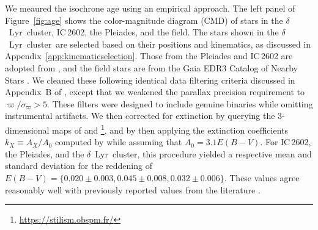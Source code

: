 \documentclass[12pt,modern,twocolumn,tighten]{aastex63}
\newcommand{\cn}{$\delta$\ Lyr\ cluster} %
\begin{document}
We meaured the isochrone age using an empirical approach.  The left
panel of Figure~\ref{fig:age} shows the color-magnitude diagram (CMD)
of stars in the \cn, IC\,2602, the Pleiades, and the field.  The stars
shown in the \cn\ are selected based on their positions and
kinematics, as discussed in Appendix~\ref{app:kinematicselection}.
Those from the Pleiades and IC\,2602 are adopted from
\citet{cantatgaudin_gaia_2018}, and the field stars are from the Gaia
EDR3 Catalog of Nearby Stars \citep{gaia_gcns_2021}.  We cleaned these
following identical data filtering criteria discussed in Appendix~B of
\citet{GaiaCollaboration2018}, except that we weakened the parallax
precision requirement to $\varpi/\sigma_\varpi>5$.  These filters were
designed to include genuine binaries while omitting instrumental
artifacts.  We then corrected for extinction by querying the
3-dimensional maps of \citet{capitanio_threedimensional_2017} and
\citet{lallement_threedimensional_2018}\footnote{\url{https://stilism.obspm.fr/}},
and by then applying the extinction coefficients $k_X\equiv A_X/A_0$
computed by \citet{GaiaCollaboration2018} while assuming that $A_0 =
3.1 E(B-V)$.  For IC\,2602, the Pleiades, and the \cn, this procedure
yielded a respective mean and standard deviation for the reddening of
$E(B-V)=\{0.020\pm0.003, 0.045\pm0.008, 0.032\pm0.006\}$.  These
values agree reasonably well with previously reported values from the
literature \citep[{\it
e.g.},][]{GaiaCollaboration2018,kounkel_untangling_2019,bossini_age_2019}.

%
%
%
\end{document}

